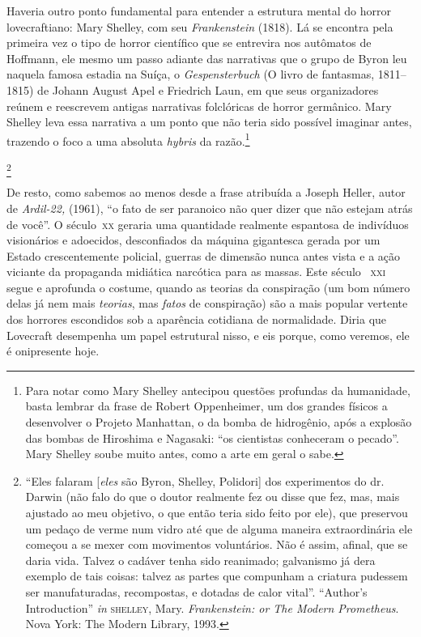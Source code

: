 Haveria outro ponto fundamental para entender a estrutura
mental do horror lovecraftiano: Mary Shelley, com seu
\emph{Frankenstein} (1818). Lá se encontra pela primeira vez o tipo de
horror científico que se entrevira nos autômatos de Hoffmann, ele mesmo
um passo adiante das narrativas que o grupo de Byron leu naquela famosa
estadia na Suíça, o \emph{Gespensterbuch} (O livro de fantasmas, 1811--1815)
de Johann August Apel e Friedrich Laun, em que seus organizadores reúnem
e reescrevem antigas narrativas folclóricas de horror germânico. Mary
Shelley leva essa narrativa a um ponto que não teria sido possível imaginar
antes, trazendo o foco a uma absoluta \emph{hybris} da razão.\footnote{Para
  notar como Mary Shelley antecipou questões profundas da humanidade,
  basta lembrar da frase de Robert Oppenheimer, um dos
  grandes físicos a desenvolver o Projeto Manhattan, o da bomba de
  hidrogênio, após a explosão das bombas de Hiroshima e Nagasaki: ``os
  cientistas conheceram o pecado''. Mary Shelley soube muito antes,
  como a arte em geral o sabe.}

\footnote{``Eles falaram {[}\emph{eles} são Byron,
  Shelley, Polidori{]} dos experimentos do dr.\,Darwin (não falo do que
  o doutor realmente fez ou disse que fez, mas, mais ajustado ao meu
  objetivo, o que então teria sido feito por ele), que preservou um
  pedaço de verme num vidro até que de alguma maneira extraordinária
  ele começou a se mexer com movimentos voluntários. Não é assim, afinal,
  que se daria vida. Talvez o cadáver tenha sido reanimado; galvanismo
  já dera exemplo de tais coisas: talvez as partes que compunham a
  criatura pudessem ser manufaturadas, recompostas, e dotadas de calor
  vital''. ``Author's Introduction'' \emph{in} \textsc{shelley}, Mary.
  \emph{Frankenstein: or The Modern Prometheus}. Nova York: The Modern
  Library, 1993.} 

De resto, como sabemos ao menos desde a frase atribuída a Joseph Heller,
autor de \emph{Ardil-22,} (1961), ``o fato de ser
paranoico não quer dizer que não estejam atrás de você''. O século~\textsc{xx}
geraria uma quantidade realmente espantosa de indivíduos visionários e
adoecidos, desconfiados da máquina gigantesca gerada por um Estado
crescentemente policial, guerras de dimensão nunca antes vista e a ação
viciante da propaganda midiática narcótica para as massas. Este século~
\textsc{xxi} segue e aprofunda o costume, quando as teorias da conspiração (um
bom número delas já nem mais \emph{teorias}, mas \emph{fatos} de
conspiração) são a mais popular vertente dos horrores escondidos sob a
aparência cotidiana de normalidade. Diria que Lovecraft desempenha um
papel estrutural nisso, e eis porque, como veremos, ele é onipresente
hoje.

